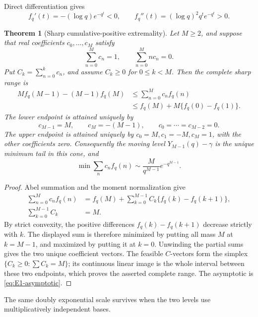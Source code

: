 \documentclass[11pt]{article}
\theoremstyle{keio}
\newtheorem{theorem}{Theorem}[section]
\theoremstyle{definition}
\theoremstyle{remark}
\begin{document}
Direct differentiation gives
\begin{equation}\label{eq:fq-convex}
 f_q'(t)=-(\log q)e^{-q^t}<0,
 \qquad
 f_q''(t)=(\log q)^2q^te^{-q^t}>0.
\end{equation}

\begin{theorem}[Sharp cumulative-positive extremality]
\label{thm:augmentation-extremality}
Let \(M\ge2\), and suppose that real coefficients \(c_0,\ldots,c_M\)
satisfy
\[
 \sum_{n=0}^Mc_n=1,
 \qquad
 \sum_{n=0}^Mnc_n=0.
\]
Put \(C_k=\sum_{n=0}^kc_n\), and assume \(C_k\ge0\) for \(0\le k<M\).
Then the complete sharp range is
\begin{equation}\label{eq:augmentation-range}
 \begin{split}
 M f_q(M-1)-(M-1)f_q(M)
 &\le \sum_{n=0}^Mc_nf_q(n)\\
 &\le f_q(M)+M\{f_q(0)-f_q(1)\}.
 \end{split}
\end{equation}
The lower endpoint is attained uniquely by
\begin{equation}\label{eq:augmentation-minimizer}
 c_{M-1}=M,\qquad c_M=-(M-1),
 \qquad c_0=\cdots=c_{M-2}=0.
\end{equation}
The upper endpoint is attained uniquely by
\(c_0=M,c_1=-M,c_M=1\), with the other coefficients zero.
Consequently the moving level \(Y_{M-1}(q)-\gamma\) is the unique minimum
tail in this cone, and
\[
 \min\sum_nc_nf_q(n)
 \sim \frac{M}{q^{M-1}}e^{-q^{M-1}}.
\]
\end{theorem}

\begin{proof}
Abel summation and the moment normalization give
\begin{align*}
 \sum_{n=0}^Mc_nf_q(n)
 &=f_q(M)+\sum_{k=0}^{M-1}C_k\{f_q(k)-f_q(k+1)\},\\
 \sum_{k=0}^{M-1}C_k&=M.
\end{align*}
By strict convexity, the positive differences
\(f_q(k)-f_q(k+1)\) decrease strictly with \(k\).  The displayed sum is
therefore minimized by putting all mass \(M\) at \(k=M-1\), and maximized
by putting it at \(k=0\).  Unwinding the partial sums gives the two unique
coefficient vectors.  The feasible \(C\)-vectors form the simplex
\(\{C_k\ge0:\sum C_k=M\}\); its continuous linear image is the whole
interval between these two endpoints, which proves the asserted complete
range.  The asymptotic is \eqref{eq:E1-asymptotic}.
\end{proof}

The same doubly exponential scale survives when the two levels use
multiplicatively independent bases.
\end{document}
